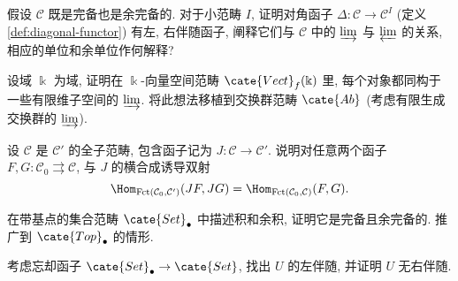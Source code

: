 \begin{Exercises}
	\item 假设 $\mathcal{C}$ 既是完备也是余完备的. 对于小范畴 $I$, 证明对角函子 $\Delta: \mathcal{C} \to \mathcal{C}^I$ (定义 \ref{def:diagonal-functor}) 有左, 右伴随函子, 阐释它们与 $\mathcal{C}$ 中的 $\varinjlim$ 与 $\varprojlim$ 的关系, 相应的单位和余单位作何解释?
	\item 设域 $\Bbbk$ 为域, 证明在 $\Bbbk$-向量空间范畴 $\cate{Vect}_f(\Bbbk)$ 里, 每个对象都同构于一些有限维子空间的 $\varinjlim$. 将此想法移植到交换群范畴 $\cate{Ab}$ (考虑有限生成交换群的 $\varinjlim$).
	\item 设 $\mathcal{C}$ 是 $\mathcal{C}'$ 的全子范畴, 包含函子记为 $J: \mathcal{C} \to \mathcal{C}'$. 说明对任意两个函子 $F, G: \mathcal{C}_0 \rightrightarrows \mathcal{C}$, 与 $J$ 的横合成诱导双射
		\[ \Hom_{\text{Fct}(\mathcal{C}_0, \mathcal{C}')}(JF, JG) = \Hom_{\text{Fct}(\mathcal{C}_0, \mathcal{C})}(F, G). \]
	\item 在带基点的集合范畴 $\cate{Set}_\bullet$ 中描述积和余积, 证明它是完备且余完备的. 推广到 $\cate{Top}_\bullet$ 的情形.
	\item 考虑忘却函子 $\cate{Set}_\bullet \to \cate{Set}$, 找出 $U$ 的左伴随, 并证明 $U$ 无右伴随.
\end{Exercises}
